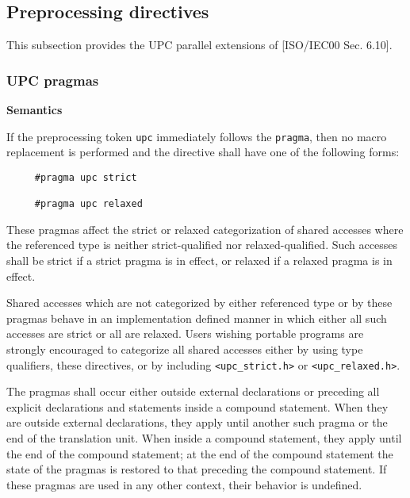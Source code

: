 \documentclass[12pt,titlepage]{article}
\newcounter{parnum}
\newcommand\np{\addtocounter{parnum}{1}\hspace{-2em}\makebox[2em][l]{\arabic{parnum}}}
\begin{document}
\subsection{Preprocessing directives}

\np This subsection provides the UPC parallel extensions of
   [ISO/IEC00 Sec. 6.10].

\subsubsection{UPC pragmas}
\label{pragmas}
{\bf Semantics} 
\np If the preprocessing token {\tt upc} immediately follows
    the {\tt pragma}, then no macro replacement is performed and the
    directive shall have one of the following forms:

\begin{verbatim}
     #pragma upc strict

     #pragma upc relaxed 
\end{verbatim}
 

\np These pragmas affect the strict or relaxed
    categorization of shared accesses where the
    referenced type is neither strict-qualified nor
    relaxed-qualified. Such accesses shall be strict if a strict
    pragma is in effect, or relaxed if a relaxed pragma is in effect.

\np Shared accesses which are not categorized by either
    referenced type or by these pragmas behave in an implementation
    defined manner in which either all such accesses are strict or
    all are relaxed.  Users wishing portable programs are strongly
    encouraged to categorize all shared accesses either by using
    type qualifiers, these directives, or by including {\tt <upc\_strict.h>}
    or {\tt <upc\_relaxed.h>}.

\np The pragmas shall occur either outside external
    declarations or preceding all explicit declarations and statements
    inside a compound statement.  When they are outside external
    declarations, they apply until another such pragma or the end of
    the translation unit.  When inside a compound statement, they
    apply until the end of the compound statement; at the end of the
    compound statement the state of the pragmas is restored to that
    preceding the compound statement.  If these pragmas are used in
    any other context, their behavior is undefined.
\end{document}
